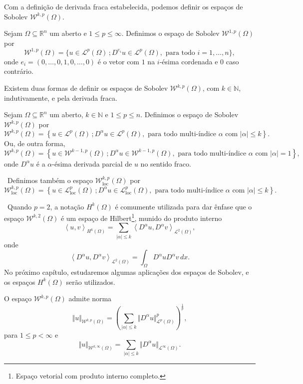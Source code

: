 \documentclass[a4paper, 11pt]{book}
\theoremstyle{definition}
\newcommand{\obs}{\noindent{\textbf{\textcolor{black}{\sffamily Observação:}}}~}
\newcommand{\bN}{\mathbb{N}}
\newcommand{\bR}{\mathbb{R}}
\newcommand{\cL}{\mathcal{L}}
\newcommand{\cW}{\mathcal{W}}
\newcommand{\esssup}{\mathrm{ess\,sup}\,}
\newcommand{\loc}{\mathrm{loc}}
\begin{document}
Com a definição de derivada fraca estabelecida, podemos definir os espaços de Sobolev $\cW^{k,p}(\Omega)$.

\begin{dbox}
    Sejam $\Omega \subseteq \bR^n$ um aberto e $1 \leqslant p \leqslant \infty$. 
    Definimos o espaço de Sobolev $\cW^{1,p}(\Omega)$ por
    \[
        \cW^{1,p}(\Omega) = \{u \in \cL^p(\Omega) \,; D^{e_i} u \in \cL^p(\Omega), \text{ para todo } i = 1,\dots,n\},
    \]
    onde $e_i = (0,\dots,0,1,0,\dots,0)$ é o vetor com $1$ na $i$-ésima cordenada e $0$ caso contrário.
\end{dbox}

Existem duas formas de definir os espaços de Sobolev $\cW^{k,p}(\Omega)$, com $k \in \bN$, indutivamente, e pela derivada fraca.

\begin{dbox}
    Sejam $\Omega \subseteq \bR ^n$ um aberto, $k \in \bN$ e $1 \leqslant p \leqslant n$. Definimos o espaço de Sobolev $\cW^{k,p}(\Omega)$ por
    \[
        \cW^{k,p}(\Omega) = \left\{ u \in \cL^p(\Omega) \,; D^\alpha u \in \cL^p(\Omega), \text{ para todo multi-índice } \alpha \text{ com } |\alpha| \leqslant k\right\}.
    \]
    Ou, de outra forma,
    \[
        \cW^{k,p}(\Omega) = \left\{ u \in \cW^{k-1,p}(\Omega) \,; D^\alpha u \in \cW^{k-1,p}(\Omega) , \text{ para todo multi-índice } \alpha \text{ com } |\alpha| = 1\right\},
    \]
    onde $D^\alpha u$ é a $\alpha$-ésima derivada parcial de $u$ no sentido fraco.
\end{dbox}

\obs Definimos também o espaço $\cW^{k,p}_\loc(\Omega)$ por
\[
    \cW^{k,p}_\loc(\Omega) = \left\{ u \in \cL^p_\loc(\Omega) \,; D^\alpha u \in \cL^p_\loc(\Omega), \text{ para todo multi-índice } \alpha \text{ com } |\alpha| \leqslant k\right\}.
\]

\obs Quando $p = 2$, a notação $H^{k}(\Omega)$ é comumente utilizada para dar ênfase que o espaço $\cW^{k,2}(\Omega)$ é um espaço de Hilbert\footnote{Espaço vetorial com produto interno completo.}, munido do produto interno
\[
    \left\langle u, v\right\rangle _{H^k(\Omega)} = \sum_{|\alpha| \leqslant k} \left\langle D^\alpha u, D^\alpha v\right\rangle _{\cL^2(\Omega)},
\]
onde
\[
    \left\langle D^\alpha u, D^\alpha v\right\rangle _{\cL^2(\Omega)} = \int_\Omega D^\alpha u D^\alpha v \,dx.
\]
No próximo capítulo, estudaremos algumas aplicações dos espaços de Sobolev, e os espaços $H^k(\Omega)$ serão utilizados.

\begin{dbox}
    O espaço $\cW^{k,p}(\Omega)$ admite norma
    \[
        \Vert u \Vert_{\cW^{k,p}(\Omega)} = \left( \sum_{|\alpha| \leqslant k} \Vert D^\alpha u \Vert_{\cL^p(\Omega)}^p \right)^{\frac{1}{p}},
    \]
    para $1 \leqslant p < \infty$ e 
    \[
        \Vert u \Vert_{\cW^{k,\infty}(\Omega)} 
        = \sum_{|\alpha| \leqslant k} \Vert D^{\alpha}u \Vert_{\cL^\infty(\Omega)}.
    \]
\end{dbox}
\end{document}
